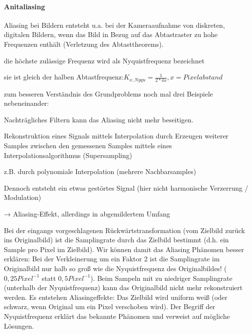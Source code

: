 \documentclass[landscape]{article}
\begin{document}
\begin{multicols}{3}
  \paragraph{Anitaliasing}
  \begin{itemize*}
    \item Aliasing bei Bildern entsteht u.a. bei der Kameraaufnahme von diskreten, digitalen Bildern, wenn das Bild in Bezug auf das Abtastraster zu hohe Frequenzen enthält (Verletzung des Abtasttheorems).
    \item die höchste zulässige Frequenz wird als Nyquistfrequenz bezeichnet
          \begin{itemize*}
            \item sie ist gleich der halben Abtastfrequenz:$K_{x,Nyqu}=\frac{1}{2*\delta x}, x = Pixelabstand$
            \item zum besseren Verständnis des Grundproblems noch mal drei Beispiele nebeneinander:
            \item Nachträgliches Filtern kann das Aliasing nicht mehr beseitigen.
          \end{itemize*}
    \item Rekonstruktion eines Signals mittels Interpolation durch Erzeugen weiterer Samples zwischen den gemessenen Samples mittels eines Interpolationsalgorithmus (Supersampling)
    \item z.B. durch polynomiale Interpolation (mehrere Nachbarsamples)
    \item Dennoch entsteht ein etwas gestörtes Signal (hier nicht harmonische Verzerrung / Modulation)
    \item → Aliasing-Effekt, allerdings in abgemildertem Umfang
  \end{itemize*}
  
  Bei der eingangs vorgeschlagenen Rückwärtstransformation (vom Zielbild zurück ins Originalbild) ist die Samplingrate durch das Zielbild bestimmt (d.h. ein Sample pro Pixel im Zielbild). 
  Wir können damit das Aliasing Phänomen besser erklären: Bei der Verkleinerung um ein Faktor 2 ist die Samplingrate im Originalbild nur halb so groß wie die
  Nyquistfrequenz des Originalbildes! ($0,25 Pixel^{-1}$ statt $0,5 Pixel^{-1}$).
  Beim Sampeln mit zu niedriger Samplingrate (unterhalb der Nyquistfrequenz) kann das Originalbild nicht mehr rekonstruiert werden. Es entstehen Aliasingeffekte: Das Zielbild wird  uniform weiß (oder schwarz, wenn Original um ein Pixel verschoben wird).
  Der Begriff der Nyquistfrequenz erklärt das bekannte Phänomen und verweist auf mögliche Lösungen.
  

\end{multicols}
\end{document}

